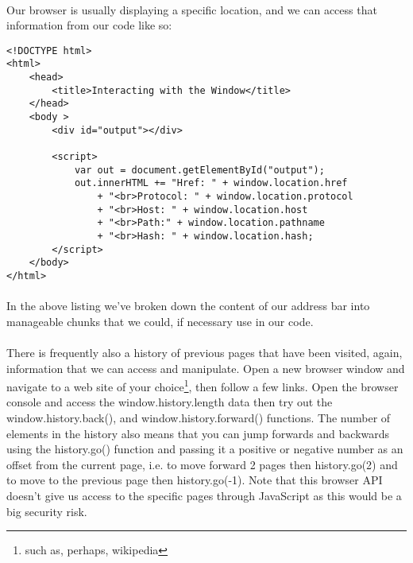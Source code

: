 \documentclass[10pt, a4paper, twosize]{article}
\begin{document}
\paragraph{} Our browser is usually displaying a specific location, and we can access that information from our code like so:

\begin{lstlisting}
<!DOCTYPE html>
<html>
    <head>
        <title>Interacting with the Window</title>
    </head>
    <body >
        <div id="output"></div>

        <script>
            var out = document.getElementById("output");
            out.innerHTML += "Href: " + window.location.href 
                + "<br>Protocol: " + window.location.protocol
                + "<br>Host: " + window.location.host
                + "<br>Path:" + window.location.pathname
                + "<br>Hash: " + window.location.hash;
        </script>
    </body>
</html>
\end{lstlisting}

\paragraph{} In the above listing we've broken down the content of our address bar into manageable chunks that we could, if necessary use in our code. 

\paragraph{} There is frequently also a history of previous pages that have been visited, again, information that we can access and manipulate. Open a new browser window and navigate to a web site of your choice\footnote{such as, perhaps, wikipedia}, then follow a few links. Open the browser console and access the window.history.length data then try out the window.history.back(), and window.history.forward() functions. The number of elements in the history also means that you can jump forwards and backwards using the history.go() function and passing it a positive or negative number as an offset from the current page, i.e. to move forward 2 pages then history.go(2) and to move to the previous page then history.go(-1). Note that this browser API doesn't give us access to the specific pages through JavaScript as this would be a big security risk.


\end{document}
